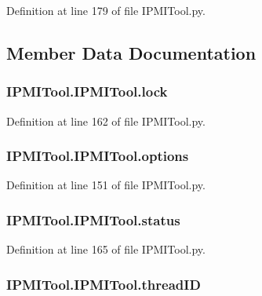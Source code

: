 Definition at line 179 of file I\-P\-M\-I\-Tool.\-py.



\subsection{Member Data Documentation}
\hypertarget{classIPMITool_1_1IPMITool_a36a9429fca7200e0a6d1d78002b95d11}{
\subsubsection[{lock}]{\setlength{\rightskip}{0pt plus 5cm}I\-P\-M\-I\-Tool.\-I\-P\-M\-I\-Tool.\-lock}}\label{classIPMITool_1_1IPMITool_a36a9429fca7200e0a6d1d78002b95d11}


Definition at line 162 of file I\-P\-M\-I\-Tool.\-py.

\hypertarget{classIPMITool_1_1IPMITool_a9f0f9484b1b8f6a0df8338f7894c8823}{
\subsubsection[{options}]{\setlength{\rightskip}{0pt plus 5cm}I\-P\-M\-I\-Tool.\-I\-P\-M\-I\-Tool.\-options}}\label{classIPMITool_1_1IPMITool_a9f0f9484b1b8f6a0df8338f7894c8823}


Definition at line 151 of file I\-P\-M\-I\-Tool.\-py.

\hypertarget{classIPMITool_1_1IPMITool_a4dba85133ceca9edff481c575cb468d9}{
\subsubsection[{status}]{\setlength{\rightskip}{0pt plus 5cm}I\-P\-M\-I\-Tool.\-I\-P\-M\-I\-Tool.\-status}}\label{classIPMITool_1_1IPMITool_a4dba85133ceca9edff481c575cb468d9}


Definition at line 165 of file I\-P\-M\-I\-Tool.\-py.

\hypertarget{classIPMITool_1_1IPMITool_aaa15d2dc90d9e3a45adc4519912c811d}{
\subsubsection[{thread\-I\-D}]{\setlength{\rightskip}{0pt plus 5cm}I\-P\-M\-I\-Tool.\-I\-P\-M\-I\-Tool.\-thread\-I\-D}}\label{classIPMITool_1_1IPMITool_aaa15d2dc90d9e3a45adc4519912c811d}


